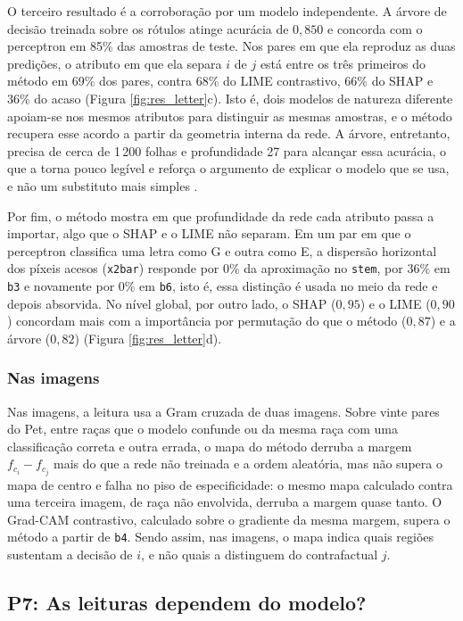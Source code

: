 O terceiro resultado é a corroboração por um modelo independente. A árvore de decisão treinada sobre os rótulos atinge acurácia de $0{,}850$ e concorda com o perceptron em 85\% das amostras de teste. Nos pares em que ela reproduz as duas predições, o atributo em que ela separa $i$ de $j$ está entre os três primeiros do método em 69\% dos pares, contra 68\% do LIME contrastivo, 66\% do SHAP e 36\% do acaso (Figura \ref{fig:res_letter}c). Isto é, dois modelos de natureza diferente apoiam-se nos mesmos atributos para distinguir as mesmas amostras, e o método recupera esse acordo a partir da geometria interna da rede. A árvore, entretanto, precisa de cerca de 1\,200 folhas e profundidade 27 para alcançar essa acurácia, o que a torna pouco legível e reforça o argumento de explicar o modelo que se usa, e não um substituto mais simples \citep{Rudin2019}.

Por fim, o método mostra em que profundidade da rede cada atributo passa a importar, algo que o SHAP e o LIME não separam. Em um par em que o perceptron classifica uma letra como G e outra como E, a dispersão horizontal dos píxeis acesos (\texttt{x2bar}) responde por 0\% da aproximação no \texttt{stem}, por 36\% em \texttt{b3} e novamente por 0\% em \texttt{b6}, isto é, essa distinção é usada no meio da rede e depois absorvida. No nível global, por outro lado, o SHAP ($0{,}95$) e o LIME ($0{,}90$) concordam mais com a importância por permutação do que o método ($0{,}87$) e a árvore ($0{,}82$) (Figura \ref{fig:res_letter}d).

\subsubsection*{Nas imagens}

Nas imagens, a leitura usa a Gram cruzada de duas imagens. Sobre vinte pares do Pet, entre raças que o modelo confunde ou da mesma raça com uma classificação correta e outra errada, o mapa do método derruba a margem $f_{c_i} - f_{c_j}$ mais do que a rede não treinada e a ordem aleatória, mas não supera o mapa de centro e falha no piso de especificidade: o mesmo mapa calculado contra uma terceira imagem, de raça não envolvida, derruba a margem quase tanto. O Grad-CAM contrastivo, calculado sobre o gradiente da mesma margem, supera o método a partir de \texttt{b4}. Sendo assim, nas imagens, o mapa indica quais regiões sustentam a decisão de $i$, e não quais a distinguem do contrafactual $j$.

\subsection{P7: As leituras dependem do modelo?}\label{subsec:res_arquitetura}

